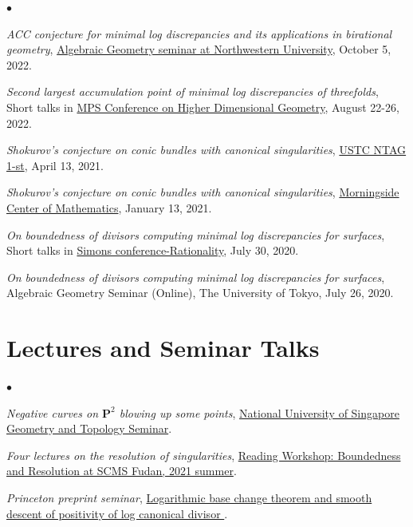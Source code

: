 \documentclass[margin,line,pifont,palatino,courier]{res}
\newenvironment{list2}{
  \begin{list}{$\bullet$}{%
      \setlength{\itemsep}{0in}
      \setlength{\parsep}{0in} \setlength{\parskip}{0in}
      \setlength{\topsep}{0in} \setlength{\partopsep}{0in}
      \setlength{\leftmargin}{0.2in}}}{\end{list}}
\begin{document}
\begin{resume}
\begin{list2}
\item \emph{ACC conjecture for minimal log discrepancies and its applications in birational geometry}, \href{https://faculty.wcas.northwestern.edu/yuchenl/AG_Seminar.html#yujie}{Algebraic Geometry seminar at Northwestern University}, October 5, 2022.
\item \emph{Second largest accumulation point of minimal log discrepancies of threefolds}, Short talks in \href{https://www.simonsfoundation.org/event/mps-conference-on-higher-dimensional-geometry-august-22-26-2022/}{MPS Conference on Higher Dimensional Geometry}, August 22-26, 2022.
\item \emph{Shokurov's conjecture on conic bundles with canonical singularities}, \href{http://staff.ustc.edu.cn/~yqliang/files/NTAG-1st.htm}{USTC NTAG 1-st}, April 13, 2021.
\item \emph{Shokurov's conjecture on conic bundles with canonical singularities}, \href{http://math.amss.cas.cn/xshd/xsbg/202101/t20210108_609547.html}{Morningside Center of Mathematics}, January 13, 2021.
\item \emph{On boundedness of divisors computing minimal log discrepancies for surfaces}, Short talks in \href{https://drive.google.com/file/d/1PuJ-Cmk3_-zPJLMf07lxQDFjc4as6bVJ/view}{Simons conference-Rationality}, July 30, 2020.
\item \emph{On boundedness of divisors computing minimal log discrepancies for surfaces}, Algebraic Geometry Seminar (Online), The University of Tokyo, July 26, 2020.
\end{list2}

\section{\sc Lectures and Seminar Talks}
\begin{list2}
\item \emph{Negative curves on $\mathbf{P}^2$ blowing up some points}, \href{https://www.math.nus.edu.sg/category/events/colloquia-seminars/topology-geometry-dynamics/page/9/}{National University of Singapore Geometry and Topology Seminar}.
\item \emph{Four lectures on the resolution of singularities}, \href{https://chenjiangfudan.github.io/home/2021-summer-reading.html}{Reading Workshop: Boundedness and Resolution at SCMS Fudan, 2021 summer}.
\item \emph{Princeton preprint seminar}, \href{https://web.math.princeton.edu/~le3339/preprint}{Logarithmic base change theorem and smooth descent of positivity of log canonical divisor }.
\end{list2}


\end{resume}
\end{document}
